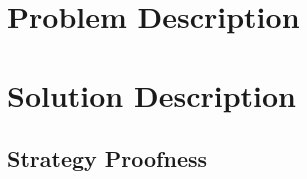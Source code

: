 \documentclass[mnsc,nonblindrev]{informs3} %
\begin{document}
%


\section{Problem Description}



\section{Solution Description}



\subsection{Strategy Proofness}
\end{document}
